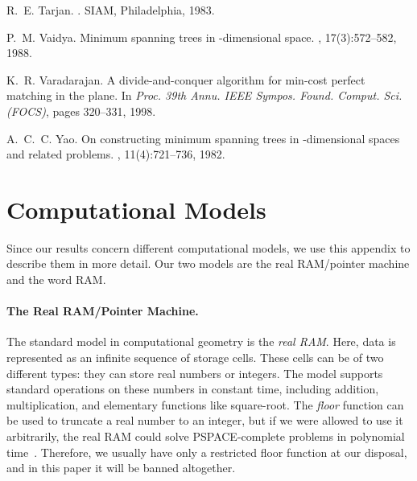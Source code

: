 \documentclass[11pt]{paper}
\begin{document}
\begin{thebibliography}{10}
R.~E. Tarjan.
.
\newblock SIAM, Philadelphia, 1983.

P.~M. Vaidya.
\newblock Minimum spanning trees in {}-dimensional space.
, 17(3):572--582, 1988.

K.~R. Varadarajan.
\newblock A divide-and-conquer algorithm for min-cost perfect matching in the
  plane.
\newblock In {\em Proc. 39th Annu. IEEE Sympos. Found. Comput. Sci. (FOCS)},
  pages 320--331, 1998.

A.~C.~C. Yao.
\newblock On constructing minimum spanning trees in {}-dimensional spaces
  and related problems.
, 11(4):721--736, 1982.

\end{thebibliography}
\normalsize























\appendix
  \section {Computational Models}
  \label{app:models}

Since our results concern different computational models, 
we use this appendix to describe them in more detail. 
Our two models are the real RAM/pointer machine and 
the word RAM.
\paragraph{The Real RAM/Pointer Machine.}
The standard model in computational geometry
is the \emph{real RAM}. Here, data is represented
as an infinite sequence of storage cells. These cells
can be of two different types: they can store real numbers
or integers. The model supports standard operations on
these numbers in constant time, including addition, 
multiplication, and elementary functions
like square-root.
The \emph{floor} function can be used to truncate a 
real number to an integer, but if we were allowed to 
use it arbitrarily, the real RAM could solve PSPACE-complete
problems in polynomial time~\cite{Schoenhage79}.
Therefore, we usually have only a restricted floor function 
at our disposal,
and in this paper it will be banned altogether. 
\end{document}
